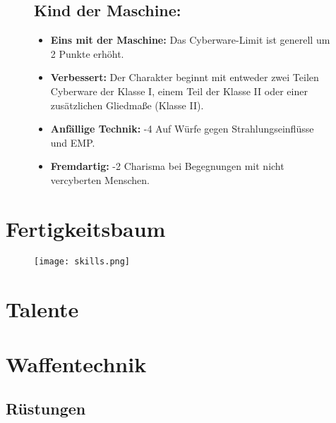\documentclass[10pt,a4paper]{report}
\begin{document}
\begin{figure}[h!]
\subsection*{Kind der Maschine:}
\begin{itemize}
\item \textbf{Eins mit der Maschine:} Das Cyberware-Limit ist generell um 2 Punkte erhöht.
\item \textbf{Verbessert:} Der Charakter beginnt mit entweder zwei Teilen Cyberware der Klasse I, einem Teil der Klasse II oder einer zusätzlichen Gliedmaße (Klasse II).
\item \textbf{Anfällige Technik:} -4 Auf Würfe gegen Strahlungseinflüsse und EMP.
\item \textbf{Fremdartig:} -2 Charisma bei Begegnungen mit nicht vercyberten Menschen.
\end{itemize}
\end{figure}


\section{Fertigkeitsbaum}
\begin{figure}[h!]
\center
\texttt{[image: skills.png]}
\end{figure}

\section{Talente}


\section{Waffentechnik}
\subsection*{Rüstungen}
\end{document}
